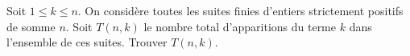 Soit $1 \leq k \leq n$. On considère toutes les suites finies d'entiers strictement positifs de somme $n$. Soit $T(n, k)$ le nombre total d'apparitions du terme $k$ dans l'ensemble de ces suites. Trouver $T(n, k)$.
